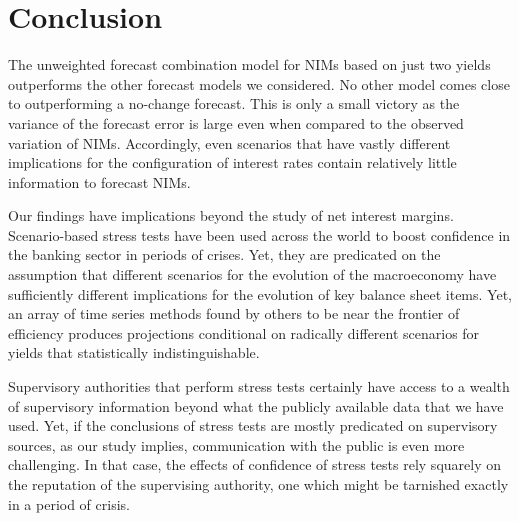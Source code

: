 \documentclass[11pt]{article}
\renewcommand{\baselinestretch}{1.5}
\begin{document}
\section{Conclusion}

The unweighted forecast combination model for NIMs based on just two yields outperforms the other forecast models we considered. No other model comes close to outperforming a no-change forecast.  This is only a small victory as the variance of the forecast error is large even when compared to the observed variation of NIMs. Accordingly, even scenarios that have vastly different implications for the configuration of interest rates contain relatively little information to forecast NIMs.

Our findings have implications beyond the study of net interest margins. Scenario-based stress tests have been used across the world to boost confidence in the banking sector in periods of crises. Yet, they are predicated on the assumption that different scenarios for the evolution of the macroeconomy have sufficiently different implications for the evolution of key balance sheet items.  Yet, an array of time series methods found by others to be near the frontier of efficiency produces projections conditional on radically different scenarios for yields that statistically indistinguishable. 

Supervisory authorities that perform stress tests certainly have access to a wealth of supervisory information beyond what  the publicly available data that we have used. Yet, if the conclusions of stress tests are mostly predicated on supervisory sources, as our study implies, communication with the public is even more challenging. In that case, the effects of confidence of stress tests rely squarely on the reputation of the supervising authority, one which might be tarnished exactly in a period of crisis.

\normalsize \clearpage
\renewcommand{\baselinestretch}{1} 







\renewcommand{\baselinestretch}{1.5}
\end{document}
